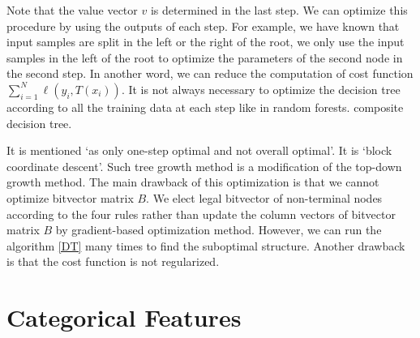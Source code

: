 \documentclass[UTF8]{article}
\begin{document}


Note that the value vector $v$ is determined in the last step.
We can optimize this procedure by using the outputs of each step.
For example, we have known that input samples are split in the left or the right of the root,
we only use the input samples in the left of the root to optimize the parameters of the second node in the second step.
In another word, we can reduce the computation of cost function $\sum_{i=1}^{N}\ell(y_i, T(x_i))$.
It is not always necessary to optimize the decision tree
according to all the training data at each step like in random forests.
composite decision tree.

It is mentioned `as only one-step optimal and not overall optimal'.
It is `block coordinate descent'. Such tree growth method is a modification of the top-down growth method.
The main drawback of this optimization is that we cannot optimize bitvector matrix $B$.
We elect legal bitvector of  non-terminal nodes according to the four rules rather
than update the column vectors of bitvector matrix $B$ by gradient-based optimization method.
However, we can run the algorithm \ref{DT} many times to find the suboptimal structure.
Another drawback is that the cost function is not regularized.



\section{Categorical Features}
\end{document}
